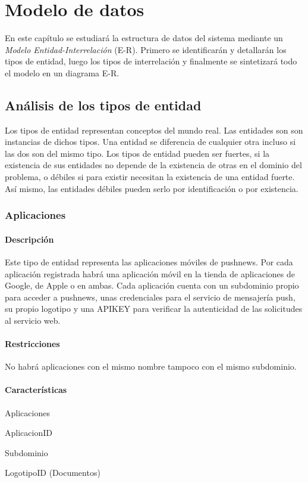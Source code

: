 \chapter{Modelo de datos}
En este capítulo se estudiará la estructura de datos del sistema mediante un \textit{Modelo Entidad-Interrelación} (E-R).
Primero se identificarán y detallarán los tipos de entidad, luego los tipos de interrelación y finalmente se sintetizará todo el modelo en un diagrama E-R.

\section {Análisis de los tipos de entidad}
Los tipos de entidad representan conceptos del mundo real. Las entidades son son instancias de dichos tipos. Una entidad se diferencia de cualquier otra incluso si las dos son del mismo tipo.
Los tipos de entidad pueden ser fuertes, si la existencia de sus entidades no depende de la existencia de otras en el dominio del problema, o débiles si para existir necesitan la existencia de una entidad fuerte. Así mismo, las entidades débiles pueden serlo por identificación o por existencia.

\subsection{Aplicaciones}
\subsubsection*{Descripción}
Este tipo de entidad representa las aplicaciones móviles de pushnews. Por cada aplicación registrada habrá una aplicación móvil en la tienda de aplicaciones de Google, de Apple o en ambas. Cada aplicación cuenta con un subdominio propio para acceder a pushnews, unas credenciales para el servicio de mensajería push, su propio logotipo y una APIKEY para verificar la autenticidad de las solicitudes al servicio web.

\subsubsection*{Restricciones}
No habrá aplicaciones con el mismo nombre tampoco con el mismo subdominio.

\subsubsection*{Características}
\begin{description}[nosep,style=multiline,labelindent=0.8cm,leftmargin=4.5cm,font=\normalfont]
    \item[Nombre] Aplicaciones
    \item[Id. principal] AplicacionID
    \item[Id. alternativo] Subdominio
    \item[Atrib. heredados] LogotipoID (Documentos)
\end{description}


